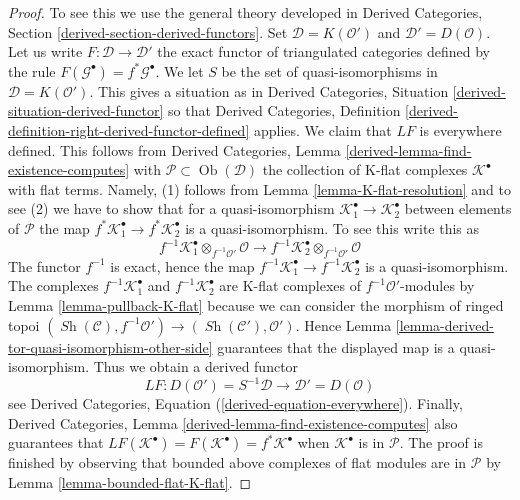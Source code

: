 \documentclass[10pt,a4paper]{amsart}
\theoremstyle{plain}
\theoremstyle{definition}
\theoremstyle{remark}
\numberwithin{equation}{subsection}
\def\Ob{\mathop{\mathrm{Ob}}\nolimits}
\def\Sh{\mathop{\mathit{Sh}}\nolimits}
\begin{document}
\begin{proof}
To see this we use the general theory developed in
Derived Categories, Section \ref{derived-section-derived-functors}.
Set $\mathcal{D} = K(\mathcal{O}')$ and $\mathcal{D}' = D(\mathcal{O})$.
Let us write $F : \mathcal{D} \to \mathcal{D}'$ the exact functor
of triangulated categories defined by the rule
$F(\mathcal{G}^\bullet) = f^*\mathcal{G}^\bullet$.
We let $S$ be the set of quasi-isomorphisms in
$\mathcal{D} = K(\mathcal{O}')$.
This gives a situation as in
Derived Categories, Situation \ref{derived-situation-derived-functor}
so that
Derived Categories, Definition
\ref{derived-definition-right-derived-functor-defined}
applies. We claim that $LF$ is everywhere defined.
This follows from
Derived Categories, Lemma \ref{derived-lemma-find-existence-computes}
with $\mathcal{P} \subset \Ob(\mathcal{D})$ the collection
of K-flat complexes $\mathcal{K}^\bullet$ with flat terms.
Namely, (1) follows from Lemma \ref{lemma-K-flat-resolution}
and to see (2) we have to show that for a quasi-isomorphism
$\mathcal{K}_1^\bullet  \to \mathcal{K}_2^\bullet$ between
elements of $\mathcal{P}$ the map
$f^*\mathcal{K}_1^\bullet  \to f^*\mathcal{K}_2^\bullet$ is a
quasi-isomorphism. To see this write this as
$$
f^{-1}\mathcal{K}_1^\bullet \otimes_{f^{-1}\mathcal{O}'} \mathcal{O}
\longrightarrow
f^{-1}\mathcal{K}_2^\bullet \otimes_{f^{-1}\mathcal{O}'} \mathcal{O}
$$
The functor $f^{-1}$ is exact, hence the map
$f^{-1}\mathcal{K}_1^\bullet  \to f^{-1}\mathcal{K}_2^\bullet$ is a
quasi-isomorphism. The complexes
$f^{-1}\mathcal{K}_1^\bullet$ and $f^{-1}\mathcal{K}_2^\bullet$
are K-flat complexes of $f^{-1}\mathcal{O}'$-modules by
Lemma \ref{lemma-pullback-K-flat}
because we can consider the morphism of ringed topoi
$(\Sh(\mathcal{C}), f^{-1}\mathcal{O}') \to
(\Sh(\mathcal{C}'), \mathcal{O}')$. Hence
Lemma \ref{lemma-derived-tor-quasi-isomorphism-other-side}
guarantees that the displayed map is a quasi-isomorphism.
Thus we obtain a derived functor
$$
LF :
D(\mathcal{O}') = S^{-1}\mathcal{D}
\longrightarrow
\mathcal{D}' = D(\mathcal{O})
$$
see
Derived Categories, Equation (\ref{derived-equation-everywhere}).
Finally,
Derived Categories, Lemma \ref{derived-lemma-find-existence-computes}
also guarantees that
$LF(\mathcal{K}^\bullet) = F(\mathcal{K}^\bullet) = f^*\mathcal{K}^\bullet$
when $\mathcal{K}^\bullet$ is in $\mathcal{P}$.
The proof is finished by observing that
bounded above complexes of flat modules are in $\mathcal{P}$
by Lemma \ref{lemma-bounded-flat-K-flat}.
\end{proof}
\end{document}
